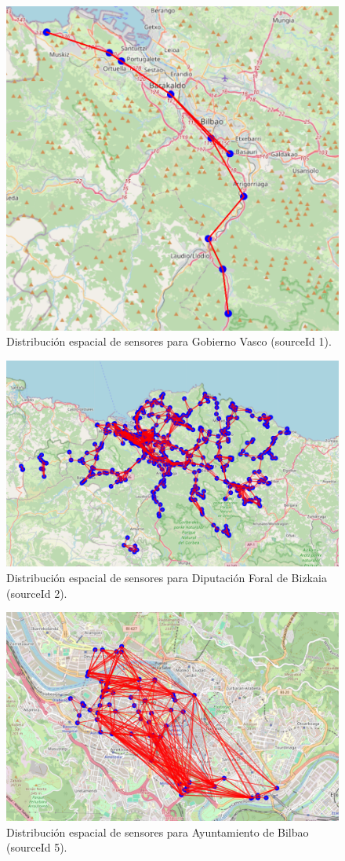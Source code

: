 \begin{figure}[H]
	\centering
	\includegraphics[width=0.5\linewidth]{includes/cap5/source_id_1_meters_mask.png}
	\caption{Distribución espacial de sensores para Gobierno Vasco (sourceId 1).}
	\label{fig:sensores_sid1}
\end{figure}

\begin{figure}[H]
	\centering
	\includegraphics[width=0.7\linewidth]{includes/cap5/source_id_2_meters_mask.png}
	\caption{Distribución espacial de sensores para Diputación Foral de Bizkaia (sourceId 2).}
	\label{fig:sensores_sid2}
\end{figure}

\begin{figure}[H]
	\centering
	\includegraphics[width=0.7\linewidth]{includes/cap5/source_id_5_meters_mask.png}
	\caption{Distribución espacial de sensores para Ayuntamiento de Bilbao (sourceId 5).}
	\label{fig:sensores_sid5}
\end{figure}

